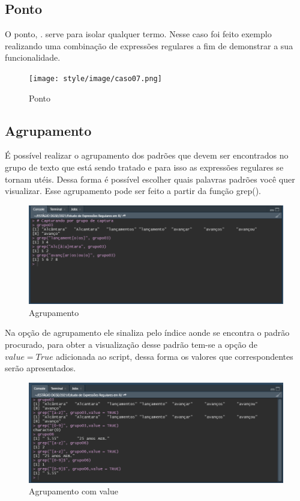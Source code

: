 \documentclass[a4paper]{article}
\begin{document}
\subsection{Ponto}
O ponto, $.$ serve para isolar qualquer termo. Nesse caso foi feito exemplo realizando uma combinação de expressões regulares a fim de demonstrar a sua funcionalidade.
\begin{figure}[htb!]
    \centering
    \texttt{[image: style/image/caso07.png]}
    \caption{Ponto}
    \label{fig:Ponto}
\end{figure}
\subsection{Agrupamento}
É possível realizar o agrupamento dos padrões que devem ser encontrados no grupo de texto que está sendo tratado e para isso as expressões regulares se tornam utéis. Dessa forma é possível escolher quais palavras padrões você quer visualizar. Esse agrupamento pode ser feito a partir da função grep().
\begin{figure}[htb!]
    \centering
    \includegraphics[width=0.7\linewidth]{style/image/caso10.png}
    \caption{Agrupamento}
    \label{fig:grep}
\end{figure}
Na opção de agrupamento ele sinaliza pelo índice aonde se encontra o padrão procurado, para obter a visualização desse padrão tem-se a opção de $value = True$ adicionada ao script, dessa forma os valores que correspondentes serão apresentados.
\begin{figure}[htb!]
    \centering
    \includegraphics[width=0.7\linewidth]{style/image/caso11.png}
    \caption{Agrupamento com value}
    \label{fig:grepwithvalue}
\end{figure}
\end{document}
